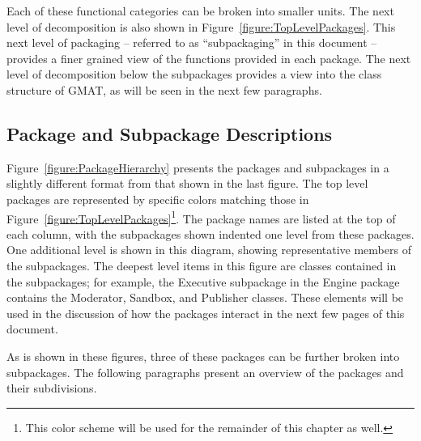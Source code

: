 Each of these functional categories can be broken into smaller units.  The next level of
decomposition is also shown in Figure~\ref{figure:TopLevelPackages}.  This next level of packaging
-- referred to as ``subpackaging'' in this document -- provides a finer grained view of the
functions provided in each package.  The next level of decomposition below the subpackages
provides a view into the class structure of GMAT, as will be seen in the next few paragraphs.

\subsection{Package and Subpackage Descriptions}

Figure~\ref{figure:PackageHierarchy} presents the packages and subpackages in a slightly different
format from that shown in the last figure.  The top level packages are represented by specific
colors matching those in Figure~\ref{figure:TopLevelPackages}\footnote{This color scheme will be
used for the remainder of this chapter as well.}.  The package names are listed at the top of each
column, with the subpackages shown indented one level from these packages.  One additional level is
shown in this diagram, showing representative members of the subpackages.  The deepest level items
in this figure are classes contained in the subpackages; for example, the Executive subpackage in
the Engine package contains the Moderator, Sandbox, and Publisher classes.  These elements will be
used in the discussion of how the packages interact in the next few pages of this document.

As is shown in these figures, three of these packages can be further broken into subpackages.  The
following paragraphs present an overview of the packages and their subdivisions.

